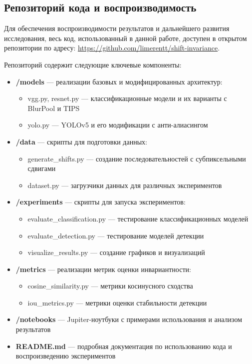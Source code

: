 \subsection{Репозиторий кода и воспроизводимость}
\label{sec:experiments:repository}

Для обеспечения воспроизводимости результатов и дальнейшего развития исследования, весь код, использованный в данной работе, доступен в открытом репозитории по адресу: \url{https://github.com/limerentt/shift-invariance}.

Репозиторий содержит следующие ключевые компоненты:

\begin{itemize}
    \item \textbf{/models} — реализации базовых и модифицированных архитектур:
    \begin{itemize}
        \item vgg.py, resnet.py — классификационные модели и их варианты с BlurPool и TIPS
        \item yolo.py — YOLOv5 и его модификации с анти-алиасингом
    \end{itemize}
    
    \item \textbf{/data} — скрипты для подготовки данных:
    \begin{itemize}
        \item generate\_shifts.py — создание последовательностей с субпиксельными сдвигами
        \item dataset.py — загрузчики данных для различных экспериментов
    \end{itemize}
    
    \item \textbf{/experiments} — скрипты для запуска экспериментов:
    \begin{itemize}
        \item evaluate\_classification.py — тестирование классификационных моделей
        \item evaluate\_detection.py — тестирование моделей детекции
        \item visualize\_results.py — создание графиков и визуализаций
    \end{itemize}
    
    \item \textbf{/metrics} — реализации метрик оценки инвариантности:
    \begin{itemize}
        \item cosine\_similarity.py — метрики косинусного сходства
        \item iou\_metrics.py — метрики оценки стабильности детекции
    \end{itemize}
    
    \item \textbf{/notebooks} — Jupiter-ноутбуки с примерами использования и анализом результатов
    
    \item \textbf{README.md} — подробная документация по использованию кода и воспроизведению экспериментов
\end{itemize}

